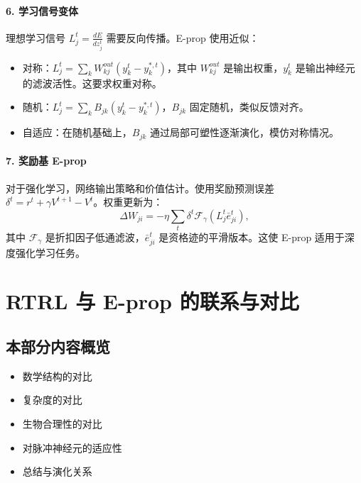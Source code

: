 \documentclass[journal,12pt,onecolumn]{IEEEtran}
\begin{document}
\paragraph{6. 学习信号变体}
理想学习信号 $L_j^t = \frac{dE}{dz_j^t}$ 需要反向传播。E-prop 使用近似：
\begin{itemize}
    \item 对称：$L_j^t = \sum_k W_{kj}^{out} (y_k^t - y_k^{*,t})$，其中 $W_{kj}^{out}$ 是输出权重，$y_k^t$ 是输出神经元的滤波活性。这要求权重对称。
    \item 随机：$L_j^t = \sum_k B_{jk} (y_k^t - y_k^{*,t})$，$B_{jk}$ 固定随机，类似反馈对齐。
    \item 自适应：在随机基础上，$B_{jk}$ 通过局部可塑性逐渐演化，模仿对称情况。
\end{itemize}

\paragraph{7. 奖励基 E-prop}
对于强化学习，网络输出策略和价值估计。使用奖励预测误差 $\delta^t = r^t + \gamma V^{t+1} - V^t$。权重更新为：
\[
\Delta W_{ji} = -\eta \sum_t \delta^t \mathcal{F}_\gamma( L_j^t \bar{e}_{ji}^t ),
\]
其中 $\mathcal{F}_\gamma$ 是折扣因子低通滤波，$\bar{e}_{ji}^t$ 是资格迹的平滑版本。这使 E-prop 适用于深度强化学习任务。

\section{RTRL 与 E-prop 的联系与对比}

\subsection*{本部分内容概览}
\begin{itemize}
    \item 数学结构的对比
    \item 复杂度的对比
    \item 生物合理性的对比
    \item 对脉冲神经元的适应性
    \item 总结与演化关系
\end{itemize}
\end{document}
